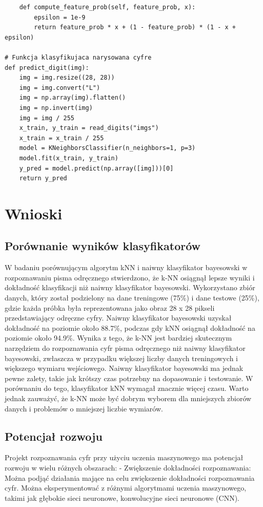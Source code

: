 \documentclass[12pt,a4paper]{article}
\begin{document}
\begin{lstlisting}
    def compute_feature_prob(self, feature_prob, x):
        epsilon = 1e-9
        return feature_prob * x + (1 - feature_prob) * (1 - x + epsilon)

# Funkcja klasyfikujaca narysowana cyfre
def predict_digit(img):
    img = img.resize((28, 28))
    img = img.convert("L")
    img = np.array(img).flatten()
    img = np.invert(img)
    img = img / 255
    x_train, y_train = read_digits("imgs")
    x_train = x_train / 255
    model = KNeighborsClassifier(n_neighbors=1, p=3)
    model.fit(x_train, y_train)
    y_pred = model.predict(np.array([img]))[0]
    return y_pred
\end{lstlisting}
\section{Wnioski}
\subsection{Porównanie wyników klasyfikatorów}
W badaniu porównującym algorytm kNN i naiwny klasyfikator
bayesowski w rozpoznawaniu pisma odręcznego stwierdzono, że k-NN osiągnął lepsze
wyniki i dokładność klasyfikacji niż naiwny klasyfikator bayesowski. Wykorzystano
zbiór danych, który został podzielony na dane treningowe (75\%) i dane testowe (25\%),
gdzie każda próbka była reprezentowana jako obraz 28 x 28 pikseli przedstawiający odręczne cyfry.
Naiwny klasyfikator bayesowski uzyskał dokładność na poziomie około 88.7\%, podczas gdy kNN osiągnął
dokładność na poziomie około 94.9\%. Wynika z tego, że k-NN
jest bardziej skutecznym narzędziem do rozpoznawania cyfr pisma odręcznego niż naiwny klasyfikator
bayesowski, zwłaszcza w przypadku większej liczby danych treningowych i większego wymiaru wejściowego.
Naiwny klasyfikator bayesowski ma jednak pewne zalety, takie jak krótszy czas potrzebny na dopasowanie i
testowanie. W porównaniu do tego, klasyfikator kNN wymagał znacznie więcej czasu. Warto jednak zauważyć,
że k-NN może być dobrym wyborem dla mniejszych zbiorów danych i problemów o mniejszej liczbie wymiarów.
\subsection{Potencjał rozwoju}

Projekt rozpoznawania cyfr przy użyciu uczenia maszynowego ma potencjał rozwoju w wielu różnych obszarach:
- Zwiększenie dokładności rozpoznawania: Można podjąć działania mające na celu zwiększenie dokładności
rozpoznawania cyfr. Można eksperymentować z różnymi algorytmami uczenia maszynowego, takimi
jak głębokie sieci neuronowe, konwolucyjne sieci neuronowe (CNN).
\end{document}

